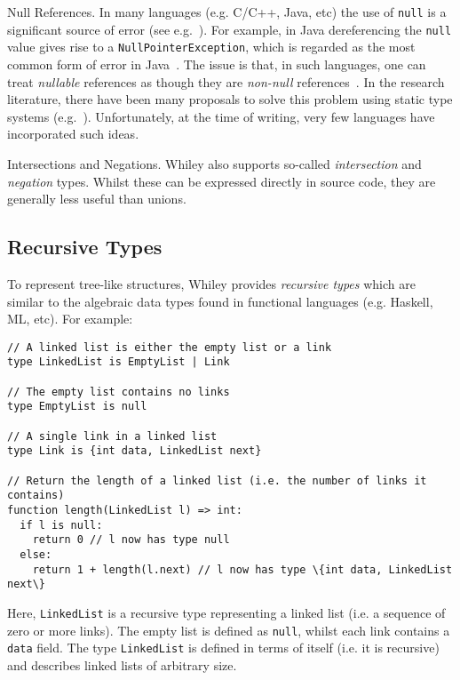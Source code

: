 \begin{insight}{Null References.}  In many languages (e.g. C/C++,
  Java, etc) the use of \lstinline{null} is a significant source of
  error (see e.g.~\cite{Hoa09}).  For example, in Java dereferencing
  the \lstinline{null} value gives rise to a
  \lstinline{NullPointerException}, which is regarded as the most
  common form of error in Java~\cite{XYZ}.  The issue is that, in such
  languages, one can treat {\em nullable} references as though they
  are {\em non-null} references~\cite{Pier02}.  In the research
  literature, there have been many proposals to solve this problem
  using static type systems
  (e.g.~\cite{PQVHV01,FL03,KH07,CFJJ06,CJ07,MPPD08,Hub08,HJP08}).
  Unfortunately, at the time of writing, very few languages have
  incorporated such ideas.
\end{insight}

\begin{insight}{Intersections and Negations.}
  Whiley also supports so-called {\em intersection} and {\em negation}
  types.  Whilst these can be expressed directly in source code, they
  are generally less useful than unions.
\end{insight}


\subsection{Recursive Types}
To represent tree-like structures, Whiley provides {\em recursive
  types} which are similar to the algebraic data types found in
functional languages (e.g. Haskell, ML, etc).  For example:
\begin{lstlisting}
// A linked list is either the empty list or a link
type LinkedList is EmptyList | Link

// The empty list contains no links
type EmptyList is null

// A single link in a linked list
type Link is {int data, LinkedList next}

// Return the length of a linked list (i.e. the number of links it contains)
function length(LinkedList l) => int:
  if l is null:    
    return 0 // l now has type null
  else:    
    return 1 + length(l.next) // l now has type \{int data, LinkedList next\}
\end{lstlisting}
Here, \lstinline{LinkedList} is a recursive type representing a linked
list (i.e. a sequence of zero or more links).  The empty list is
defined as \lstinline{null}, whilst each link contains a
\lstinline{data} field.  The type \lstinline{LinkedList} is defined in
terms of itself (i.e. it is recursive) and describes linked lists of
arbitrary size.

